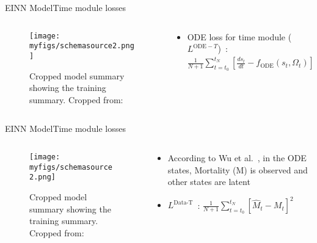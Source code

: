 \documentclass[
	aspectratio=169,	%
	onlytextwidth,		%
	t,					%
	]{beamer}
\begin{document}
\begin{frame}[fragile]{EINN Model}{Time module losses}
	\begin{columns}
		
		\begin{column}[T]{.5\textwidth}
			\begin{figure}
				\texttt{[image: myfigs/schemasource2.png]}
				\caption{Cropped model summary showing the training summary. Cropped from:~\cite{main}}
			\end{figure}
		\end{column}
		
		\begin{column}[T]{.5\textwidth}
			\begin{itemize}
				\item ODE loss for time module ($L^{\text{ODE}-T}$)~\cite{main}: $\frac{1}{N+1}\sum_{t=t_{0}}^{t_{N}} \left[ \frac{ds_{t}}{dt} - f_{\text{ODE}}(s_{t}, \Omega_{t}) \right] ^{2} $
			\end{itemize}
		\end{column}
			
\end{columns}
\end{frame}

\begin{frame}[fragile]{EINN Model}{Time module losses}
	\begin{columns}
		
		\begin{column}[T]{.5\textwidth}
			\begin{figure}
				\texttt{[image: myfigs/schemasource2.png]}
				\caption{Cropped model summary showing the training summary. Cropped from:~\cite{main}}
			\end{figure}
		\end{column}
		
		\begin{column}[T]{.5\textwidth}
			\begin{itemize}
				\item<1-> According to Wu et al.~\cite{wu}, in the ODE states, Mortality (M) is observed and other states are latent
				\item<2-> $L^{\text{Data-T}}$~\cite{main}: $\frac{1}{N+1}\sum_{t=t_{0}}^{t_{N}} \left[ \hat{M}_{t} - M_{t} \right]^{2}$
			\end{itemize}
		\end{column}
			
\end{columns}
\end{frame}
\end{document}
